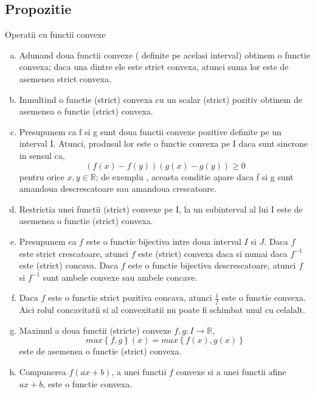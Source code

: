 \documentclass[a4paper,12pt,oneside]{report}
\begin{document}
\subsection{Propozitie}
Operatii cu functii convexe 
\begin{enumerate}[a)]
\item Adunand doua functii convexe ( definite pe acelasi interval) obtinem o functie convexa; daca una dintre ele este strict convexa, atunci suma lor este de asemenea strict convexa.
\item Inmultind o functie (strict) convexa cu un scalar (strict)  pozitiv obtinem de asemenea o functie (strict) convexa.
\item Presupunem ca f si g sunt doua functii convexe pozitive definite pe un interval I. Atunci, produsul lor este o functie convexa pe I daca sunt sincrone in sensul ca, \begin{displaymath}
   \left ( f\left ( x \right ) - f\left ( y \right ) \right )\left ( g\left ( x \right ) - g\left ( y \right )\right )\geq 0
\end{displaymath} pentru orice \(x , y \in \mathbb{R}\); de exemplu , aceasta conditie apare daca f si g sunt amandoua descrescatoare sau amandoua crescatoare.
\item Restrictia unei functii (strict) convexe pe I, la un subinterval al lui I este de asemenea o functie (strict) convexa. 
\item Presupunem ca \(f\) este o functie bijectiva intre doua interval \(I\) si \(J\). Daca \(f\) este strict crescatoare, atunci \(f\) este (strict) convexa daca si numai daca \(f^{-1}\) este (strict) concava. Daca \(f\) este o functie bijectiva descrescatoare, atunci \(f\) si  \(f^{-1}\) sunt ambele convexe sau ambele concave.
\item Daca \(f\) este o functie strict pozitiva concava, atunci \(\frac{1}{f}\) este o functie convexa. Aici rolul concavitatii si al convexitatii nu poate fi schimbat unul cu celalalt.
\item Maximul a doua functii (stricte) convexe \(f , g : I \rightarrow \mathbb{R}\),
\begin{displaymath}
  max \left \{ f , g \right \}\left ( x \right )=  max \left \{ f\left ( x \right ), g\left ( x \right ) \right \}
\end{displaymath} este de asemenea o functie (strict) convexa.
\item Compunerea \(f\left ( ax + b \right )\), a unei functii \(f\) convexe si a unei functii afine \(ax+b\), este o functie convexa. 
\end{enumerate}
\end{document}
